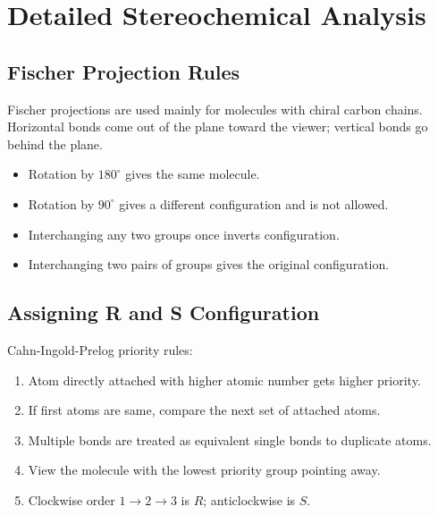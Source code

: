 \documentclass[12pt,a4paper]{article}
\begin{document}
\section{Detailed Stereochemical Analysis}

\subsection{Fischer Projection Rules}
Fischer projections are used mainly for molecules with chiral carbon chains. Horizontal bonds come out of the plane toward the viewer; vertical bonds go behind the plane.

\begin{tcolorbox}[tikzbox, title={Fischer Projection Convention}]
\centering
{}
\end{tcolorbox}

\begin{tcolorbox}[masonbox, title={Rules for Fischer Projections}]
\begin{itemize}[leftmargin=*, itemsep=2pt, topsep=2pt]
  \item Rotation by $180^\circ$ gives the same molecule.
  \item Rotation by $90^\circ$ gives a different configuration and is not allowed.
  \item Interchanging any two groups once inverts configuration.
  \item Interchanging two pairs of groups gives the original configuration.
\end{itemize}
\end{tcolorbox}

\subsection{Assigning R and S Configuration}
Cahn-Ingold-Prelog priority rules:
\begin{enumerate}[leftmargin=*, itemsep=3pt, topsep=2pt]
  \item Atom directly attached with higher atomic number gets higher priority.
  \item If first atoms are same, compare the next set of attached atoms.
  \item Multiple bonds are treated as equivalent single bonds to duplicate atoms.
  \item View the molecule with the lowest priority group pointing away.
  \item Clockwise order $1\rightarrow2\rightarrow3$ is $R$; anticlockwise is $S$.
\end{enumerate}
\end{document}

